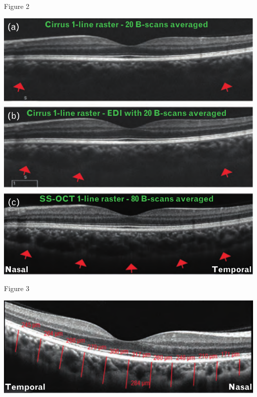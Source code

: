 \documentclass{beamer}
\begin{document}
\begin{frame}{Figure 2}
    \begin{center}
        \includegraphics[height=0.8\textheight]{2.png}
    \end{center}
\end{frame}

\begin{frame}{Figure 3}
    \begin{center}
        \includegraphics[width=\textwidth]{3.png}
    \end{center}
\end{frame}
\end{document}
